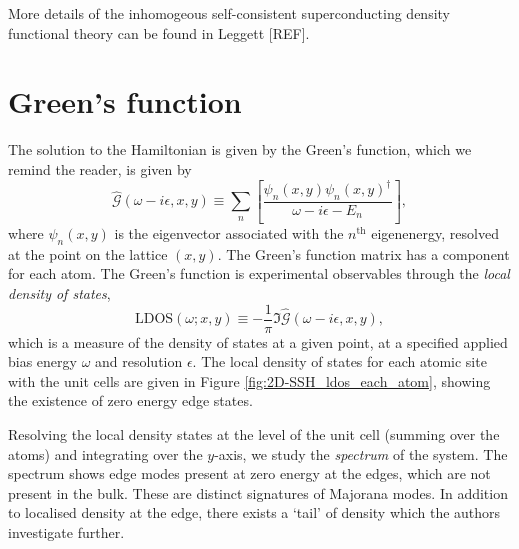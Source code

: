 More details of the inhomogeous self-consistent superconducting density functional theory can be found in Leggett [{\color{red}REF}].

\section{Green's function}

The solution to the Hamiltonian is given by the Green's function, which we remind the reader, is given by
\begin{equation}
    \hat{\mathcal{G}}(\omega-i\epsilon,x,y)
    \equiv
    \sum_n\left[
        \frac{\psi_n(x,y)\psi_n(x,y)^\dagger}{\omega-i\epsilon-E_n}
        \right],
\end{equation}
where $\psi_n(x,y)$ is the eigenvector associated with the $n^\text{th}$ eigenenergy, resolved at the point on the lattice $(x,y)$. 
The Green's function matrix has a component for each atom.
The Green's function is experimental observables through the {\it local density of states},
\begin{equation}
    \text{LDOS}(\omega;x,y)
    \equiv
    -\frac{1}{\pi}\Im\hat{\mathcal{G}}(\omega-i\epsilon,x,y)
,
\end{equation}
which is a measure of the density of states at a given point, at a specified applied bias energy $\omega$ and resolution $\epsilon$.
The local density of states for each atomic site with the unit cells are given in Figure \ref{fig:2D-SSH_ldos_each_atom}, showing the existence of zero energy edge states.


Resolving the local density states at the level of the unit cell (summing over the atoms) and integrating over the $y$-axis, we study the {\it spectrum} of the system. 
The spectrum shows edge modes present at zero energy at the edges, which are not present in the bulk. These are distinct signatures of Majorana modes. 
In addition to localised density at the edge, there exists a `tail' of density which the authors investigate further.

